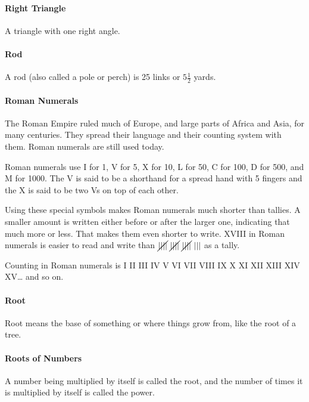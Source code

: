 \documentclass[12pt]{article}
\begin{document}
\paragraph{Right Triangle} A triangle with one right angle.

\begin{center}
\end{center}

\paragraph{Rod}
A rod (also called a pole or perch) is 25 links or $5\frac{1}{2}$ yards.

\paragraph{Roman Numerals} The Roman Empire ruled much of Europe, and large parts of Africa and Asia, for many centuries. They spread their language and their counting system with them. Roman numerals are still used today.

Roman numerals use I for 1, V for 5, X for 10, L for 50, C for 100, D for 500, and M for 1000. The V is said to be a shorthand for a spread hand with 5 fingers and the X is said to be two Vs on top of each other.

Using these special symbols makes Roman numerals much shorter than tallies. A smaller amount is written either before or after the larger one, indicating that much more or less. That makes them even shorter to write. XVIII in Roman numerals is easier to read and write than $\cancel{||||}\ \cancel{||||}\ \cancel{||||}\ |||$ as a tally.

Counting in Roman numerals is I II III IV V VI VII VIII IX X XI XII XIII XIV XV… and so on.

\paragraph{Root}
Root means the base of something or where things grow from, like the root of a tree.

\paragraph{Roots of Numbers}
A number being multiplied by itself is called the root, and the number of times it is multiplied by itself is called the power.
\end{document}
